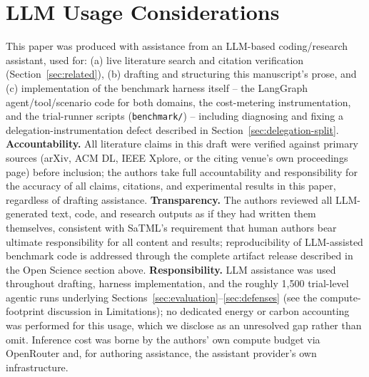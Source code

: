 \documentclass[conference]{IEEEtran}
\begin{document}
\section*{LLM Usage Considerations}

This paper was produced with assistance from an LLM-based coding/research assistant, used for: (a) live literature search and citation verification (Section~\ref{sec:related}), (b) drafting and structuring this manuscript's prose, and (c) implementation of the benchmark harness itself -- the LangGraph agent/tool/scenario code for both domains, the cost-metering instrumentation, and the trial-runner scripts (\texttt{benchmark/}) -- including diagnosing and fixing a delegation-instrumentation defect described in Section~\ref{sec:delegation-split}. \textbf{Accountability.} All literature claims in this draft were verified against primary sources (arXiv, ACM DL, IEEE Xplore, or the citing venue's own proceedings page) before inclusion; the authors take full accountability and responsibility for the accuracy of all claims, citations, and experimental results in this paper, regardless of drafting assistance. \textbf{Transparency.} The authors reviewed all LLM-generated text, code, and research outputs as if they had written them themselves, consistent with SaTML's requirement that human authors bear ultimate responsibility for all content and results; reproducibility of LLM-assisted benchmark code is addressed through the complete artifact release described in the Open Science section above. \textbf{Responsibility.} LLM assistance was used throughout drafting, harness implementation, and the roughly 1{,}500 trial-level agentic runs underlying Sections~\ref{sec:evaluation}--\ref{sec:defenses} (see the compute-footprint discussion in Limitations); no dedicated energy or carbon accounting was performed for this usage, which we disclose as an unresolved gap rather than omit. Inference cost was borne by the authors' own compute budget via OpenRouter and, for authoring assistance, the assistant provider's own infrastructure.



\end{document}
